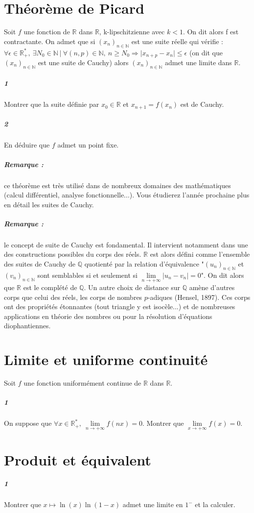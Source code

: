 \documentclass[10pt,a4paper]{article}
\begin{document}
\section{Théorème de Picard}
Soit $f$ une fonction de $\mathbb{R}$ dans $\mathbb{R}$, k-lipschitzienne avec $k<1$. On dit alors f est contractante. On admet que si $(x_n)_{n \in \mathbb{N}}$ est une suite réelle qui vérifie : $\forall \epsilon \in \mathbb{R}_{+}^*, \ \exists N_0 \in \mathbb{N} \ | \ \forall (n,p) \in \mathbb{N}, \ n \ge N_0 \Rightarrow \vert x_{n+p}-x_n \vert \le \epsilon$ (on dit que $(x_n)_{n \in \mathbb{N}}$ est une suite de Cauchy) alors $(x_n)_{n \in \mathbb{N}}$ admet une limite dans $\mathbb{R}$.
\subparagraph{1}Montrer que la suite définie par $x_0 \in \mathbb{R}$ et $x_{n+1}=f(x_n)$ est de Cauchy.
\subparagraph{2}En déduire que $f$ admet un point fixe.
\subparagraph{Remarque :} ce théorème est très utilisé dans de nombreux domaines des mathématiques (calcul différentiel, analyse fonctionnelle...). Vous étudierez l'année prochaine plus en détail les suites de Cauchy.
\subparagraph{Remarque :} le concept de suite de Cauchy est fondamental. Il intervient notamment dans une des constructions possibles du corps des réels. $\mathbb{R}$ est alors défini comme l'ensemble des suites de Cauchy de $\mathbb{Q}$ quotienté par la relation d'équivalence "$(u_n)_{n \in \mathbb{N}}$ et $(v_n)_{n \in \mathbb{N}}$ sont semblables si et seulement si $\underset{n \rightarrow +\infty}{\lim}  \vert u_n-v_n \vert = 0$". On dit alors que $\mathbb{R}$ est le complété de $\mathbb{Q}$. Un autre choix de distance sur $\mathbb{Q}$ amène d'autres corps que celui des réels, les corps de nombres $p$-adiques (Hensel, 1897). Ces corps ont des propriétés étonnantes (tout triangle y est isocèle...) et de nombreuses applications en théorie des nombres ou pour la résolution d'équations diophantiennes.

\section{Limite et uniforme continuité}
Soit $f$ une fonction uniformément continue de $\mathbb{R}$ dans $\mathbb{R}$.
\subparagraph{1}On suppose que $\forall x\in \mathbb{R}_+^*, \ \underset{n \rightarrow +\infty}{\lim}f(nx)=0$. Montrer que $\underset{x \rightarrow +\infty}{\lim}f(x)=0$.
\section{Produit et équivalent}
\subparagraph{1}Montrer que $x \mapsto \ln(x)\ln(1-x)$ admet une limite en $1^-$ et la calculer.
\end{document}
